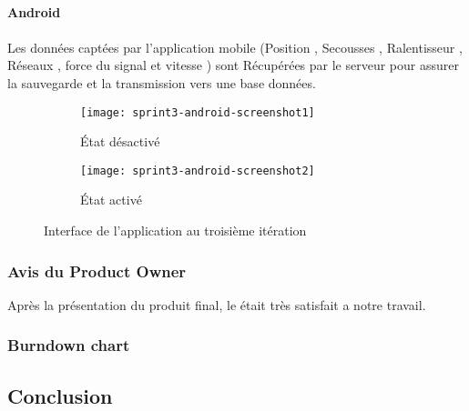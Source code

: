 \paragraph{Android}
\paragraph*{}
Les données captées par l'application mobile (Position , Secousses , Ralentisseur , Réseaux , force du 
signal et vitesse ) sont Récupérées par le serveur pour assurer la sauvegarde et la transmission vers une 
base données.\\

\begin{figure}[htbp]
    \begin{subfigure}{.5\textwidth}
    \centering
  \centering
  \texttt{[image: sprint3-android-screenshot1]}
  \caption{État désactivé}
  \label{fig:sprint3-android-screenshot1}
\end{subfigure}
\begin{subfigure}{.5\textwidth}
    \centering
  \centering
  \texttt{[image: sprint3-android-screenshot2]}
  \caption{État activé}
  \label{fig:sprint3-android-screenshot2}
\end{subfigure}
\caption{Interface de l'application au troisième itération}
\end{figure}
\clearpage

\subsubsection{Avis du Product Owner}

Après la présentation du produit final, le  était très satisfait
a notre travail.

\subsubsection{Burndown chart}


\subsection{Conclusion}

